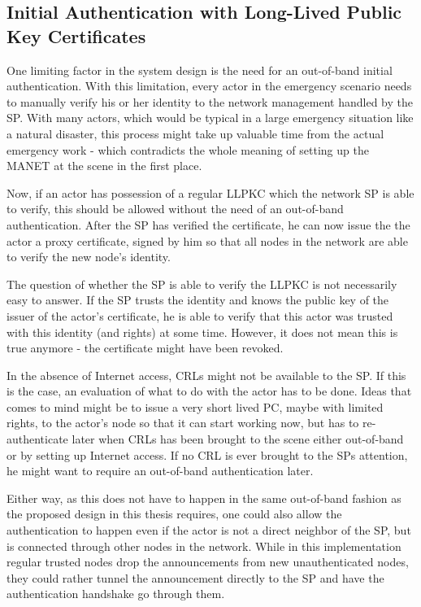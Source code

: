 \subsection{Initial Authentication with Long-Lived Public Key Certificates}
One limiting factor in the system design is the need for an out-of-band
initial authentication. With this limitation, every actor in the emergency
scenario needs to manually verify his or her identity to the network management
handled by the \ac{SP}. With many actors, which would be typical in a large
emergency situation like a natural disaster, this process might take up valuable
time from the actual emergency work - which contradicts the whole meaning of
setting up the \ac{MANET} at the scene in the first place.

Now, if an actor has possession of a regular \ac{LLPKC} which the network
\ac{SP} is able to verify, this should be allowed without the need of an
out-of-band authentication. After the \ac{SP} has verified the certificate, he
can now issue the the actor a proxy certificate, signed by him so that all nodes
in the network are able to verify the new node's identity.

The question of whether the \ac{SP} is able to verify the \ac{LLPKC} is not
necessarily easy to answer. If the \ac{SP} trusts the identity and knows the
public key of the issuer of the actor's certificate, he is able to verify that
this actor was trusted with this identity (and rights) at some time. However, it
does not mean this is true anymore - the certificate might have been revoked.

In the absence of Internet access, \acp{CRL} might not be available to the
\ac{SP}. If this is the case, an evaluation of what to do with the actor has to
be done. Ideas that comes to mind might be to issue a very short lived \ac{PC},
maybe with limited rights, to the actor's node so that it can start working now,
but has to re-authenticate later when \acp{CRL} has been brought to the scene
either out-of-band or by setting up Internet access. If no \ac{CRL} is ever
brought to the SPs attention, he might want to require an out-of-band
authentication later.

Either way, as this does not have to happen in the same out-of-band fashion as
the proposed design in this thesis requires, one could also allow the
authentication to happen even if the actor is not a direct neighbor of the
\ac{SP}, but is connected through other nodes in the network. While in this
implementation regular trusted nodes drop the announcements from new
unauthenticated nodes, they could rather tunnel the announcement directly to
the \ac{SP} and have the authentication handshake go through them.

